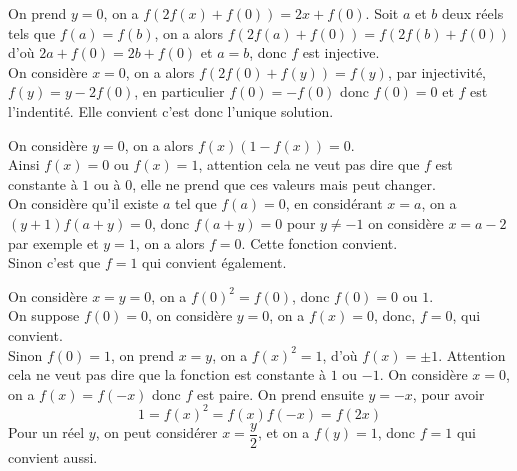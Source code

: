 

\begin{sol}[][2]
On prend $y=0$, on a $f(2f(x)+f(0))=2x+f(0)$. Soit $a$ et $b$ deux réels tels que $f(a)=f(b)$, on a alors $f(2f(a)+f(0))=f(2f(b)+f(0))$ d'où $2a+f(0)=2b+f(0)$ et $a=b$, donc $f$ est injective.\\
On considère $x=0$, on a alors $f(2f(0)+f(y))=f(y)$, par injectivité, $f(y)=y-2f(0)$, en particulier $f(0)=-f(0)$ donc $f(0)=0$ et $f$ est l'indentité. Elle convient c'est donc l'unique solution.
\end{sol}
\begin{sol}[][3]
On considère $y=0$, on a alors $f(x)(1-f(x))=0$.\\
Ainsi $f(x)=0$ ou $f(x)=1$, attention cela ne veut pas dire que $f$ est constante à $1$ ou à $0$, elle ne prend que ces valeurs mais peut changer.\\
On considère qu'il existe $a$ tel que $f(a)=0$, en considérant $x=a$, on a $(y+1)f(a+y)=0$, donc $f(a+y)=0$ pour $y\ne-1$ on considère $x=a-2$ par exemple et $y=1$, on a alors $f=0$. Cette fonction convient. \\
Sinon c'est que $f=1$ qui convient également.
\end{sol}
\begin{sol}[][4]
On considère $x=y=0$, on a $f(0)^2=f(0)$, donc $f(0)=0$ ou $1$.\\
On suppose $f(0)=0$, on considère $y=0$, on a $f(x)=0$, donc, $f=0$, qui convient.\\
Sinon $f(0)=1$, on prend $x=y$, on a $f(x)^2=1$, d'où $f(x)=\pm1$. Attention cela ne veut pas dire que la fonction est constante à $1$ ou $-1$. On considère $x=0$, on a $f(x)=f(-x)$ donc $f$ est paire. On prend ensuite $y=-x$, pour avoir $$1=f(x)^2=f(x)f(-x)=f(2x)$$
Pour un réel $y$, on peut considérer $x=\dfrac y2$, et on a $f(y)=1$, donc $f=1$ qui convient aussi.
\end{sol}

